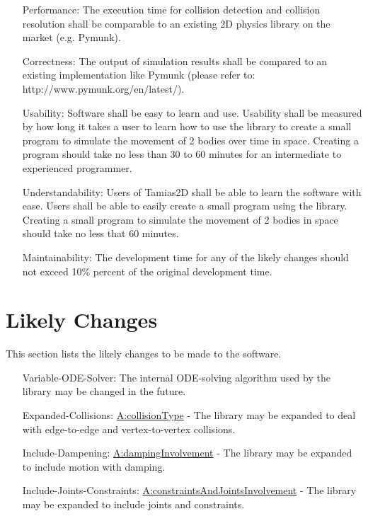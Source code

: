 \documentclass[12pt]{article}
\begin{document}
\begin{itemize}
\item[Performance:\phantomsection\label{performance}]{The execution time for collision detection and collision resolution shall be comparable to an existing 2D physics library on the market (e.g. Pymunk).}
\item[Correctness:\phantomsection\label{correctness}]{The output of simulation results shall be compared to an existing implementation like Pymunk (please refer to: http://www.pymunk.org/en/latest/).}
\item[Usability:\phantomsection\label{usability}]{Software shall be easy to learn and use. Usability shall be measured by how long it takes a user to learn how to use the library to create a small program to simulate the movement of 2 bodies over time in space. Creating a program should take no less than 30 to 60 minutes for an intermediate to experienced programmer.}
\item[Understandability:\phantomsection\label{understandability}]{Users of Tamias2D shall be able to learn the software with ease. Users shall be able to easily create a small program using the library. Creating a small program to simulate the movement of 2 bodies in space should take no less that 60 minutes.}
\item[Maintainability:\phantomsection\label{maintainability}]{The development time for any of the likely changes should not exceed 10$\%$ percent of the original development time.}
\end{itemize}
\section{Likely Changes}
\label{Sec:LCs}
This section lists the likely changes to be made to the software.

\begin{itemize}
\item[Variable-ODE-Solver:\phantomsection\label{lcVODES}]{The internal ODE-solving algorithm used by the library may be changed in the future.}
\item[Expanded-Collisions:\phantomsection\label{lcEC}]{\hyperref[assumpCT]{A:collisionType} - The library may be expanded to deal with edge-to-edge and vertex-to-vertex collisions.}
\item[Include-Dampening:\phantomsection\label{lcID}]{\hyperref[assumpDI]{A:dampingInvolvement} - The library may be expanded to include motion with damping.}
\item[Include-Joints-Constraints:\phantomsection\label{lcIJC}]{\hyperref[assumpCAJI]{A:constraintsAndJointsInvolvement} - The library may be expanded to include joints and constraints.}
\end{itemize}
\end{document}
